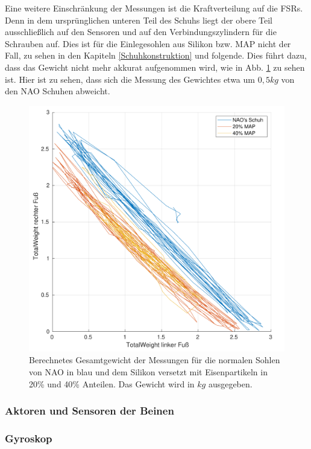 Eine weitere Einschränkung der Messungen ist die Kraftverteilung auf die FSRs. Denn in dem ursprünglichen unteren Teil des Schuhs liegt der obere Teil ausschließlich auf den Sensoren und auf den Verbindungszylindern für die Schrauben auf. Dies ist für die Einlegesohlen aus Silikon bzw. MAP nicht der Fall, zu sehen in den Kapiteln \ref{Schuhkonstruktion} und folgende. Dies führt dazu, dass das Gewicht nicht mehr akkurat aufgenommen wird, wie in Abb. \ref{total_weight} zu sehen ist. Hier ist zu sehen, dass sich die Messung des Gewichtes etwa um $0,5 \unit{kg}$ von den NAO Schuhen abweicht. 
\begin{figure}[tb]
	\centering
	\includegraphics[width=0.9\linewidth]{Bilder/TotalWeight_Grund_20_40_mean.pdf}
	\caption{Berechnetes Gesamtgewicht der Messungen für die normalen Sohlen von NAO in blau und dem Silikon versetzt mit Eisenpartikeln in 20\% und 40\% Anteilen. Das Gewicht wird in $\unit{kg}$ ausgegeben.}
	\label{total_weight}
\end{figure}

\subsubsection*{Aktoren und Sensoren der Beinen}

\subsubsection*{Gyroskop}

